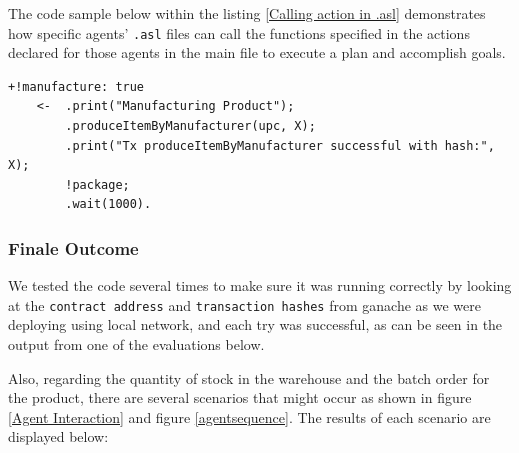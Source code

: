 \vspace{.5cm}

The code sample below within the listing \ref{Calling action in .asl} demonstrates how specific agents' \texttt{.asl} files can call the functions specified in the actions declared for those agents in the main file to execute a plan and accomplish goals.

\vspace{.5cm}

\begin{lstlisting}[caption={Calling action in .asl},label={Calling action in .asl},frame=none, numbers=none]
    +!manufacture: true
    <-  .print("Manufacturing Product");
        .produceItemByManufacturer(upc, X);
        .print("Tx produceItemByManufacturer successful with hash:", X);
        !package;
        .wait(1000).
\end{lstlisting}

\vspace{.5cm}
\subsubsection{Finale Outcome}

We tested the code several times to make sure it was running correctly by looking at the \texttt{contract address} and \texttt{transaction hashes} from ganache as we were deploying using local network, and each try was successful, as can be seen in the output from one of the evaluations below.

\vspace{.5cm}

Also, regarding the quantity of stock in the warehouse and the batch order for the product, there are several scenarios that might occur as shown in figure \ref{Agent Interaction} and figure \ref{agentsequence}. The results of each scenario are displayed below:

\vspace{.5cm}

